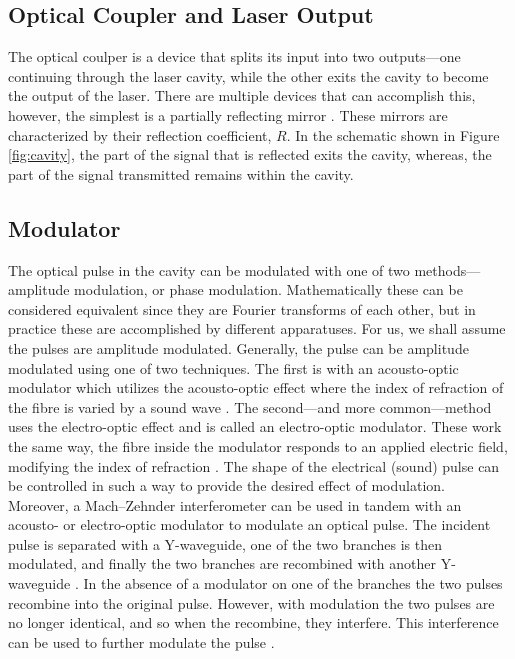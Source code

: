 \subsection{Optical Coupler and Laser Output}
The optical coulper is a device that splits its input into two outputs---one continuing through the laser cavity, while the other exits the cavity to become the output of the laser. There are multiple devices that can accomplish this, however, the simplest is a partially reflecting mirror \cite{alazzawi}. These mirrors are characterized by their reflection coefficient, $R$. In the schematic shown in Figure \ref{fig:cavity}, the part of the signal that is reflected exits the cavity, whereas, the part of the signal transmitted remains within the cavity. \\

\subsection{Modulator}
The optical pulse in the cavity can be modulated with one of two methods---amplitude modulation, or phase modulation. Mathematically these can be considered equivalent since they are Fourier transforms of each other, but in practice these are accomplished by different apparatuses. For us, we shall assume the pulses are amplitude modulated. Generally, the pulse can be amplitude modulated using one of two techniques. The first is with an acousto-optic modulator which utilizes the acousto-optic effect where the index of refraction of the fibre is varied by a sound wave \cite{hausbook, karim}. The second---and more common---method uses the electro-optic effect and is called an electro-optic modulator. These work the same way, the fibre inside the modulator responds to an applied electric field, modifying the index of refraction \cite{agrawal2002, goldstein, hausbook, karim}. The shape of the electrical (sound) pulse can be controlled in such a way to provide the desired effect of modulation. \\

Moreover, a Mach--Zehnder interferometer can be used in tandem with an acousto- or electro-optic modulator to modulate an optical pulse. The incident pulse is separated with a Y-waveguide, one of the two branches is then modulated, and finally the two branches are recombined with another Y-waveguide \cite{alazzawi, hausbook, karim}. In the absence of a modulator on one of the branches the two pulses recombine into the original pulse. However, with modulation the two pulses are no longer identical, and so when the recombine, they interfere. This interference can be used to further modulate the pulse \cite{agrawal2002, agrawal2013, hausbook, karim}. \\

